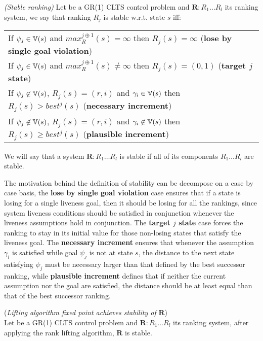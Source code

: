 \begin{definition}\label{def:gr1_stable_ranking} \emph{(Stable ranking)} 
	Let \controlProblemDef be a GR(1) CLTS control problem and $\mathbf{R}:R_1 \ldots R_l$ its ranking system, we say that ranking $R_j$ is stable w.r.t. state $s$ iff:
	\vspace{1em}
	\begin{center}
		\begin{tabular}{l}
			If $\psi_j \in \mathbb{V}(s)$ and $max_R^{j \oplus 1}(s) = \infty$ then $R_j(s) = \infty$ (\textbf{lose by single goal violation})\\
			If $\psi_j \in \mathbb{V}(s)$ and $max_R^{j \oplus 1}(s) \neq \infty$ then $R_j(s) = (0,1)$ (\textbf{target $j$ state})\\			
			If $\psi_j \not\in \mathbb{V}(s)$, $R_j(s) = (r,i)$ and $\gamma_i \in \mathbb{V}(s)$ then  $R_j(s) > best^j(s)$ (\textbf{necessary increment})\\						
			If $\psi_j \not\in \mathbb{V}(s)$, $R_j(s) = (r,i)$ and $\gamma_i \not\in \mathbb{V}(s)$ then  $R_j(s) \geq best^j(s)$ (\textbf{plausible increment})\\
		\end{tabular}
	\end{center}
We will say that a system $\mathbf{R}:R_1 \ldots R_l$ is stable if all of its components $R_1 \ldots R_l$ are stable.
\end{definition}

The motivation behind the definition of stability can be decompose on a case by case basis, the \textbf{lose by single goal violation} case ensures that if a state is losing for a single liveness goal, then it should be losing for all the rankings, since system liveness conditions should be satisfied in conjunction whenever the liveness assumptions hold in conjunction. The \textbf{target $j$ state} case forces the ranking to stay in its initial value for those non-losing states that satisfy the liveness goal. The \textbf{necessary increment} ensures that whenever the assumption $\gamma_i$ is satisfied while goal $\psi_j$ is not at state $s$, the distance to the next state satisfying $\psi_j$ must be necessary larger than that defined by the best successor ranking, while \textbf{plausible increment} defines that if neither the current assumption nor the goal are satisfied, the distance should be at least equal than that of the best successor ranking.

\begin{lemma}(\emph{Lifting algorithm fixed point achieves stability of}  $\mathbf{R}$)\label{theorem:gr1_lifting_stability}\\
	Let \controlProblemDef be a GR(1) CLTS control problem and $\mathbf{R}:R_1 \ldots R_l$ its ranking system, after applying the rank lifting algorithm, $\mathbf{R}$ is stable.
\end{lemma}

